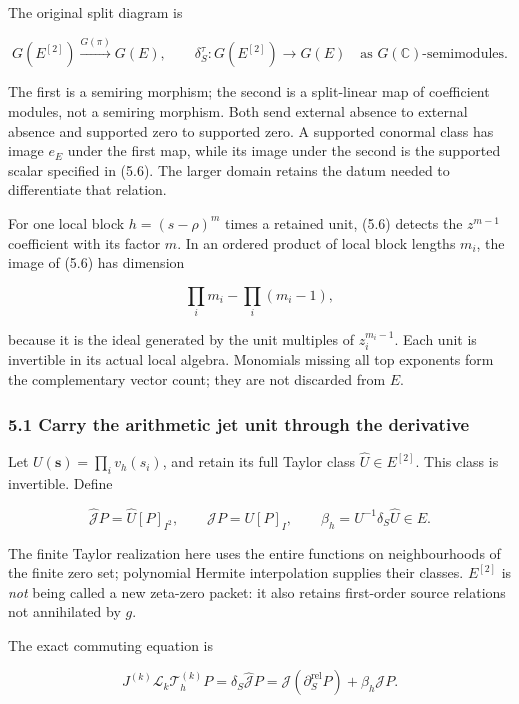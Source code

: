 The original split diagram is

\[G(E^{[2]})\xrightarrow{G(\pi)}G(E),\qquad
\delta_S^\tau:G(E^{[2]})\longrightarrow G(E)\quad\text{as }G(\mathbb C)\text{-semimodules}.\tag{5.8}\]

The first is a semiring morphism; the second is a split-linear map of
coefficient modules, not a semiring morphism. Both send external absence
to external absence and supported zero to supported zero. A supported
conormal class has image \(e_E\) under the first map, while its image
under the second is the supported scalar specified in (5.6). The larger
domain retains the datum needed to differentiate that relation.

For one local block \(h=(s-\rho)^m\) times a retained unit, (5.6)
detects the \(z^{m-1}\) coefficient with its factor \(m\). In an ordered
product of local block lengths \(m_i\), the image of (5.6) has dimension

\[\prod_i m_i-\prod_i(m_i-1),\tag{5.9}\]

because it is the ideal generated by the unit multiples of
\(z_i^{m_i-1}\). Each unit is invertible in its actual local algebra.
Monomials missing all top exponents form the complementary vector count;
they are not discarded from \(E\).

\subsubsection{5.1 Carry the arithmetic jet unit through the
derivative}\label{sum_connection:carry-the-arithmetic-jet-unit-through-the-derivative}

Let \(U(\mathbf s)=\prod_i v_h(s_i)\), and retain its full Taylor class
\(\widehat U\in E^{[2]}\). This class is invertible. Define

\[\widehat{\mathcal J}P=\widehat U[P]_{I^2},\qquad \mathcal JP=U[P]_I,\qquad \beta_h=U^{-1}\delta_S\widehat U\in E.\tag{5.10}\]

The finite Taylor realization here uses the entire functions on
neighbourhoods of the finite zero set; polynomial Hermite interpolation
supplies their classes. \(E^{[2]}\) is \emph{not} being called a new
zeta-zero packet: it also retains first-order source relations not
annihilated by \(g\).

The exact commuting equation is

\[\boxed{J^{(k)}\mathscr L_k\mathcal T_h^{(k)}P
=\delta_S\widehat{\mathcal J}P
=\mathcal J(\partial_S^{\mathrm{rel}}P)+\beta_h\mathcal JP.}\tag{5.11}\]

